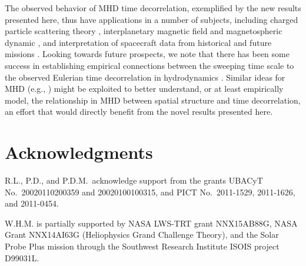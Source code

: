 \documentclass[aip,pop,reprint,amsmath,amssymb,floatfix]{revtex4-1}
\begin{document}
The observed behavior of MHD time decorrelation, exemplified by the
new results presented here, thus have applications in a number of
subjects, including charged particle scattering theory
\cite{schlickeiser_cosmic-ray_1993, nelkin_time_1990}, interplanetary
magnetic field and magnetospheric dynamic \cite{miller_critical_1997},
and interpretation of spacecraft data from historical and future
missions \cite{matthaeus_ensemble_2016}.  Looking towards future
prospects, we note that there has been some success in establishing
empirical connections between the sweeping time scale to the observed 
Eulerian time decorrelation in hydrodynamics
\cite{chen_sweeping_1989}.  Similar ideas for MHD (e.g.,
\cite{matthaeus_dynamical_1999}) might be exploited to better
understand, or at least empirically model, the relationship in MHD
between spatial structure and time decorrelation, an effort that would
directly benefit from the novel results presented here.


\section{Acknowledgments}\label{sec_Acknowledgments}

R.L., P.D., and P.D.M.~acknowledge support from the grants UBACyT
No.~20020110200359 and 20020100100315, and PICT No.~2011-1529,
2011-1626, and 2011-0454.

W.H.M. is partially supported by NASA LWS-TRT grant NNX15AB88G, NASA
Grant NNX14AI63G (Heliophysics Grand Challenge Theory), and the Solar
Probe Plus mission through the Southwest Research Institute ISOIS
project D99031L.




\end{document}
